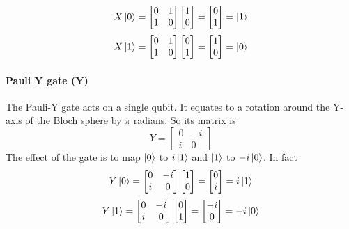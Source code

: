 \documentclass[main.tex]{subfiles}
\theoremstyle{definition}
\begin{document}
	$$
	X\ket{0}=
	\begin{bmatrix}
	0 & 1\\
	1 & 0
	\end{bmatrix}
	\begin{bmatrix}
	1 \\
	0
	\end{bmatrix}
	=
	\begin{bmatrix}
	0 \\
	1
	\end{bmatrix}
	=\ket{1}
	$$
	$$
	X\ket{1}=
	\begin{bmatrix}
	0 & 1\\
	1 & 0
	\end{bmatrix}
	\begin{bmatrix}
	0 \\
	1
	\end{bmatrix}
	=
	\begin{bmatrix}
	1 \\
	0
	\end{bmatrix}
	=\ket{0}
	$$
	
	\paragraph{Pauli Y gate (Y)} The Pauli-Y gate acts on a single qubit. It equates to a rotation around the Y-axis of the Bloch sphere by $\pi$ radians. So its matrix is 
	\begin{equation}
	Y=
	\begin{bmatrix}
	0 & -i\\
	i & 0
	\end{bmatrix}
	\end{equation}
	The effect of the gate is to map
	$\ket{0}$ to $i\ket{1}$ and 
	$\ket{1}$ to $-i\ket{0}$. In fact
	$$
	Y\ket{0}=
	\begin{bmatrix}
	0 & -i\\
	i & 0
	\end{bmatrix}
	\begin{bmatrix}
	1 \\
	0
	\end{bmatrix}
	=
		\begin{bmatrix}
	0 \\
	i
	\end{bmatrix}
	=
	i\ket{1}
	$$
	$$
	Y\ket{1}=
	\begin{bmatrix}
	0 & -i\\
	i & 0
	\end{bmatrix}
	\begin{bmatrix}
	0 \\
	1
	\end{bmatrix}
	=
		\begin{bmatrix}
	-i \\
	0
	\end{bmatrix}
	=
	-i\ket{0}
	$$
	
\end{document}
